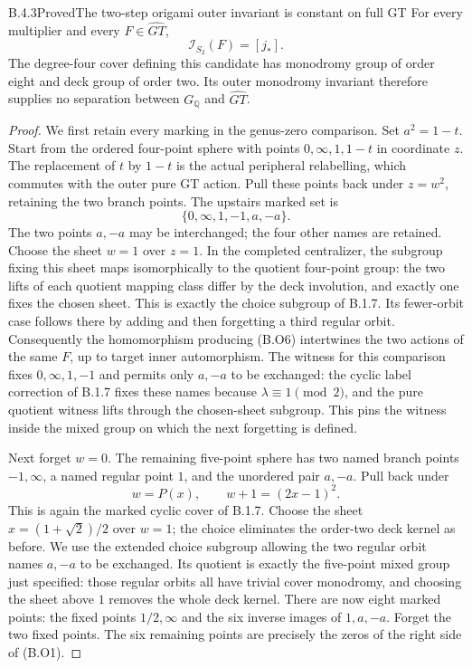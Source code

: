 \begin{result}{B.4.3}{Proved}{The two-step origami outer invariant is constant on full GT}
For every multiplier and every \(F\in\widehat{GT}\),
\[
                \mathcal I_{S_2}(F)=[j_*].              \tag{B.O5}
\]
The degree-four cover defining this candidate has monodromy
group of order eight and deck group of order two. Its
outer monodromy invariant therefore supplies no separation
between \(G_{\mathbb Q}\) and \(\widehat{GT}\).
\end{result}
\begin{proof}
We first retain every marking in the genus-zero comparison.
Set \(a^2=1-t\). Start from the ordered four-point sphere
with points \(0,\infty,1,1-t\) in coordinate \(z\).
The replacement of \(t\) by \(1-t\) is the actual
peripheral relabelling, which commutes with the outer pure
GT action. Pull these points back under \(z=w^2\),
retaining the two branch points. The upstairs marked set is
\[
          \{0,\infty,1,-1,a,-a\}.                       \tag{B.O6}
\]
The two points \(a,-a\) may be interchanged; the four
other names are retained. Choose the sheet \(w=1\)
over \(z=1\). In the completed centralizer, the subgroup
fixing this sheet maps isomorphically to the quotient
four-point group: the two lifts of each quotient mapping
class differ by the deck involution, and exactly one
fixes the chosen sheet. This is exactly the choice
subgroup of B.1.7. Its fewer-orbit case follows there
by adding and then forgetting a third regular orbit.
Consequently the homomorphism producing (B.O6) intertwines
the two actions of the same \(F\), up to target inner
automorphism.
The witness for this comparison fixes
\(0,\infty,1,-1\) and permits only \(a,-a\)
to be exchanged: the cyclic label correction of
B.1.7 fixes these names because \(\lambda\equiv1\pmod2\),
and the pure quotient witness lifts through the chosen-sheet
subgroup. This pins the witness inside the mixed group
on which the next forgetting is defined.

Next forget \(w=0\). The remaining five-point sphere
has two named branch points \(-1,\infty\), a named
regular point \(1\), and the unordered pair \(a,-a\).
Pull back under
\[
                   w=P(x),\qquad w+1=(2x-1)^2.          \tag{B.O7}
\]
This is again the marked cyclic cover of B.1.7. Choose
the sheet \(x=(1+\sqrt2)/2\) over \(w=1\); the
choice eliminates the order-two deck kernel as before.
We use the extended choice subgroup allowing the two
regular orbit names \(a,-a\) to be exchanged. Its
quotient is exactly the five-point mixed group just
specified: those regular orbits all have trivial cover
monodromy, and choosing the sheet above \(1\) removes
the whole deck kernel.
There are now eight marked points: the fixed points
\(1/2,\infty\) and the six inverse images of
\(1,a,-a\). Forget the two fixed points. The six
remaining points are precisely the zeros of the
right side of (B.O1).


\end{proof}
